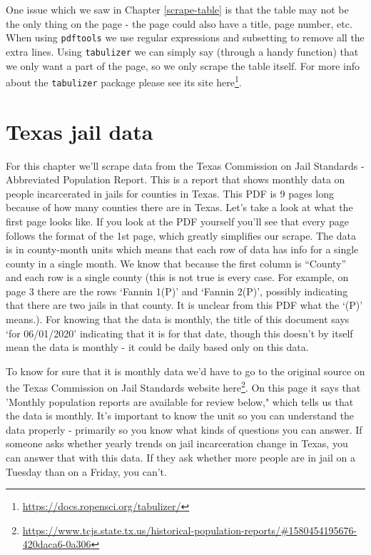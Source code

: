 \documentclass[
]{krantz}
\renewcommand{\href}[2]{#2\footnote{\url{#1}}}
\begin{document}
One issue which we saw in Chapter \ref{scrape-table} is that the table may not be the only thing on the page - the page could also have a title, page number, etc. When using \texttt{pdftools} we use regular expressions and subsetting to remove all the extra lines. Using \texttt{tabulizer} we can simply say (through a handy function) that we only want a part of the page, so we only scrape the table itself. For more info about the \texttt{tabulizer} package please see its site \href{https://docs.ropensci.org/tabulizer/}{here}.

\hypertarget{texas-jail-data}{%
\section{Texas jail data}\label{texas-jail-data}}

For this chapter we'll scrape data from the Texas Commission on Jail Standards - Abbreviated Population Report. This is a report that shows monthly data on people incarcerated in jails for counties in Texas. This PDF is 9 pages long because of how many counties there are in Texas. Let's take a look at what the first page looks like. If you look at the PDF yourself you'll see that every page follows the format of the 1st page, which greatly simplifies our scrape. The data is in county-month units which means that each row of data has info for a single county in a single month. We know that because the first column is ``County'' and each row is a single county (this is not true is every case. For example, on page 3 there are the rows `Fannin 1(P)' and `Fannin 2(P)', possibly indicating that there are two jails in that county. It is unclear from this PDF what the `(P)' means.). For knowing that the data is monthly, the title of this document says `for 06/01/2020' indicating that it is for that date, though this doesn't by itself mean the data is monthly - it could be daily based only on this data.

To know for sure that it is monthly data we'd have to go to the original source on the Texas Commission on Jail Standards website \href{https://www.tcjs.state.tx.us/historical-population-reports/\#1580454195676-420daca6-0a306}{here}. On this page it says that 'Monthly population reports are available for review below," which tells us that the data is monthly. It's important to know the unit so you can understand the data properly - primarily so you know what kinds of questions you can answer. If someone asks whether yearly trends on jail incarceration change in Texas, you can answer that with this data. If they ask whether more people are in jail on a Tuesday than on a Friday, you can't.
\end{document}
